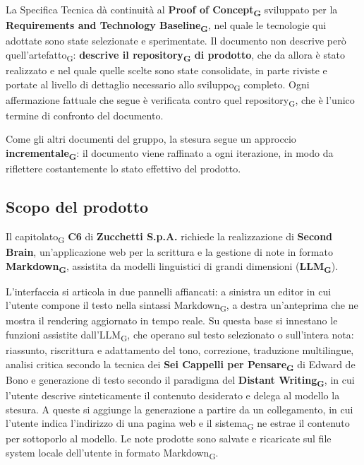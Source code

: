 \documentclass[a4paper, 10pt]{article}
\begin{document}
La Specifica Tecnica dà continuità al \textbf{Proof of Concept\textsubscript{G}} sviluppato per la \textbf{Requirements and Technology Baseline\textsubscript{G}}, nel quale le tecnologie qui adottate sono state selezionate e sperimentate. Il documento non descrive però quell'artefatto\textsubscript{G}: \textbf{descrive il repository\textsubscript{G} di prodotto}, che da allora è stato realizzato e nel quale quelle scelte sono state consolidate, in parte riviste e portate al livello di dettaglio necessario allo sviluppo\textsubscript{G} completo. Ogni affermazione fattuale che segue è verificata contro quel repository\textsubscript{G}, che è l'unico termine di confronto del documento.

Come gli altri documenti del gruppo, la stesura segue un approccio \textbf{incrementale\textsubscript{G}}: il documento viene raffinato a ogni iterazione, in modo da riflettere costantemente lo stato effettivo del prodotto.

\subsection{Scopo del prodotto}
\label{sec:scopo-prodotto}
Il capitolato\textsubscript{G} \textbf{C6} di \textbf{Zucchetti S.p.A.} richiede la realizzazione di \textbf{Second Brain}, un'applicazione web per la scrittura e la gestione di note in formato \textbf{Markdown\textsubscript{G}}, assistita da modelli linguistici di grandi dimensioni (\textbf{LLM\textsubscript{G}}).

L'interfaccia si articola in due pannelli affiancati: a sinistra un editor in cui l'utente compone il testo nella sintassi Markdown\textsubscript{G}, a destra un'anteprima che ne mostra il rendering aggiornato in tempo reale. Su questa base si innestano le funzioni assistite dall'LLM\textsubscript{G}, che operano sul testo selezionato o sull'intera nota: riassunto, riscrittura e adattamento del tono, correzione, traduzione multilingue, analisi critica secondo la tecnica dei \textbf{Sei Cappelli per Pensare\textsubscript{G}} di Edward de Bono e generazione di testo secondo il paradigma del \textbf{Distant Writing\textsubscript{G}}, in cui l'utente descrive sinteticamente il contenuto desiderato e delega al modello la stesura. A queste si aggiunge la generazione a partire da un collegamento, in cui l'utente indica l'indirizzo di una pagina web e il sistema\textsubscript{G} ne estrae il contenuto per sottoporlo al modello. Le note prodotte sono salvate e ricaricate sul file system locale dell'utente in formato Markdown\textsubscript{G}.
\end{document}
